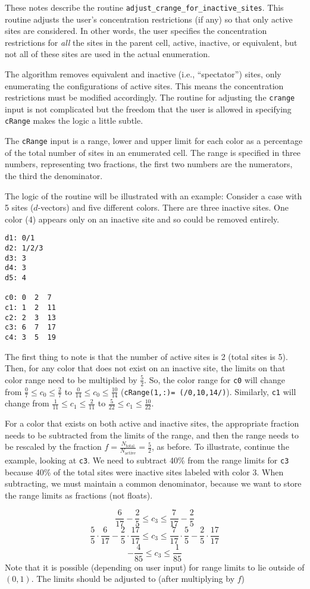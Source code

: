 \documentclass[12pt]{article}
\begin{document}
These notes describe the routine \verb=adjust_crange_for_inactive_sites=. This routine adjusts the user's concentration restrictions (if any) so that only active sites are considered. In other words, the user specifies the concentration restrictions for \emph{all} the sites in the parent cell, active, inactive, or equivalent, but not all of these sites are used in the actual enumeration.

The algorithm removes equivalent and inactive (i.e., ``spectator'') sites, only enumerating the configurations of active sites. This means the concentration restrictions must be modified accordingly. The routine for adjusting the \verb=crange= input is not complicated but the freedom that the user is allowed in specifying \verb=cRange= makes the logic a little subtle.

The \verb=cRange= input is a range, lower and upper limit for each color as a percentage of the total number of sites in an enumerated cell. The range is specified in three numbers, representing two fractions, the first two numbers are the numerators, the third the denominator.

The logic of the routine will be illustrated with an example: Consider a case with 5 sites ($d$-vectors) and five different colors. There are three inactive sites. One color (4) appears only on an inactive site and so could be removed entirely.
\begin{verbatim}
d1: 0/1
d2: 1/2/3
d3: 3
d4: 3
d5: 4

c0: 0  2  7
c1: 1  2  11
c2: 2  3  13
c3: 6  7  17
c4: 3  5  19
\end{verbatim}

The first thing to note is that the number of active sites is 2 (total sites is 5). Then, for any color that does not exist on an inactive site, the limits on that color range need to be multiplied by $\frac{5}{2}$. So, the color range for \verb=c0= will change from $\frac{0}{7}\leq c_0\leq \frac{2}{7}$ to $\frac{0}{14}\leq c_0\leq\frac{10}{14}$ (\verb&cRange(1,:)= (/0,10,14/)&). Similarly, \verb=c1= will change from $\frac{1}{11}\leq c_1\leq\frac{2}{11}$ to $\frac{5}{22}\leq c_1\leq\frac{10}{22}$.

For a color that exists on both active and inactive sites, the appropriate fraction needs to be subtracted from the limits of the range, and then the range needs to be rescaled by the fraction $f=\frac{N_\mathrm{total}}{N_\mathrm{active}}=\frac{5}{2}$, as before. To illustrate, continue the example, looking at \verb=c3=. We need to subtract 40\% from the range limits for \verb=c3= because
40\% of the total sites were inactive sites labeled with color 3. When subtracting, we must maintain a common denominator, because we want to store the range limits as fractions (not floats).

$$\frac{6}{17}-\frac{2}{5}\leq c_3\leq \frac{7}{17}-\frac{2}{5}$$
$$\frac{5}{5}\cdot\frac{6}{17}-\frac{2}{5}\cdot\frac{17}{17}\leq c_3\leq \frac{7}{17}\cdot\frac{5}{5}-\frac{2}{5}\cdot\frac{17}{17}$$
$$-\frac{4}{85}\leq c_3\leq \frac{1}{85}$$
Note that it is possible (depending on user input) for range limits to lie outside of $(0,1)$. The limits should be adjusted to (after multiplying by $f$)
\end{document}
